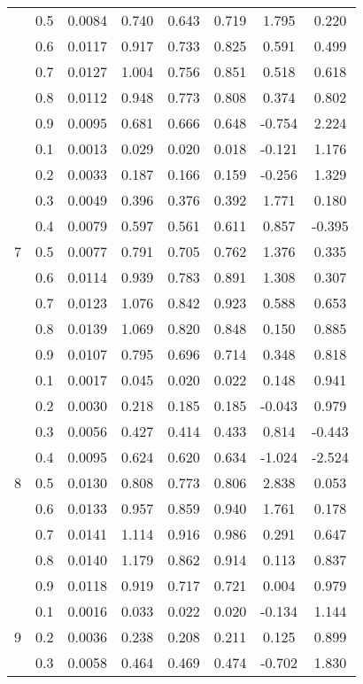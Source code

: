 \documentclass[11pt,a4paper]{report}
\begin{document}
\begin{longtable}{ | c | c || c | c | c | c | c | c | }
 & 0.5 & 0.0084 & 0.740 & 0.643 & 0.719 & 1.795 & 0.220 \\
 & 0.6 & 0.0117 & 0.917 & 0.733 & 0.825 & 0.591 & 0.499 \\
 & 0.7 & 0.0127 & 1.004 & 0.756 & 0.851 & 0.518 & 0.618 \\
 & 0.8 & 0.0112 & 0.948 & 0.773 & 0.808 & 0.374 & 0.802 \\
 & 0.9 & 0.0095 & 0.681 & 0.666 & 0.648 & -0.754 & 2.224 \\
 \hline
\multirow{9}{*}{7} & 0.1 & 0.0013 & 0.029 & 0.020 & 0.018 & -0.121 & 1.176 \\
 & 0.2 & 0.0033 & 0.187 & 0.166 & 0.159 & -0.256 & 1.329 \\
 & 0.3 & 0.0049 & 0.396 & 0.376 & 0.392 & 1.771 & 0.180 \\
 & 0.4 & 0.0079 & 0.597 & 0.561 & 0.611 & 0.857 & -0.395 \\
 & 0.5 & 0.0077 & 0.791 & 0.705 & 0.762 & 1.376 & 0.335 \\
 & 0.6 & 0.0114 & 0.939 & 0.783 & 0.891 & 1.308 & 0.307 \\
 & 0.7 & 0.0123 & 1.076 & 0.842 & 0.923 & 0.588 & 0.653 \\
 & 0.8 & 0.0139 & 1.069 & 0.820 & 0.848 & 0.150 & 0.885 \\
 & 0.9 & 0.0107 & 0.795 & 0.696 & 0.714 & 0.348 & 0.818 \\
 \hline
\multirow{9}{*}{8} & 0.1 & 0.0017 & 0.045 & 0.020 & 0.022 & 0.148 & 0.941 \\
 & 0.2 & 0.0030 & 0.218 & 0.185 & 0.185 & -0.043 & 0.979 \\
 & 0.3 & 0.0056 & 0.427 & 0.414 & 0.433 & 0.814 & -0.443 \\
 & 0.4 & 0.0095 & 0.624 & 0.620 & 0.634 & -1.024 & -2.524 \\
 & 0.5 & 0.0130 & 0.808 & 0.773 & 0.806 & 2.838 & 0.053 \\
 & 0.6 & 0.0133 & 0.957 & 0.859 & 0.940 & 1.761 & 0.178 \\
 & 0.7 & 0.0141 & 1.114 & 0.916 & 0.986 & 0.291 & 0.647 \\
 & 0.8 & 0.0140 & 1.179 & 0.862 & 0.914 & 0.113 & 0.837 \\
 & 0.9 & 0.0118 & 0.919 & 0.717 & 0.721 & 0.004 & 0.979 \\
 \hline
\multirow{9}{*}{9} & 0.1 & 0.0016 & 0.033 & 0.022 & 0.020 & -0.134 & 1.144 \\
 & 0.2 & 0.0036 & 0.238 & 0.208 & 0.211 & 0.125 & 0.899 \\
 & 0.3 & 0.0058 & 0.464 & 0.469 & 0.474 & -0.702 & 1.830 \\

\end{longtable}
\end{document}
